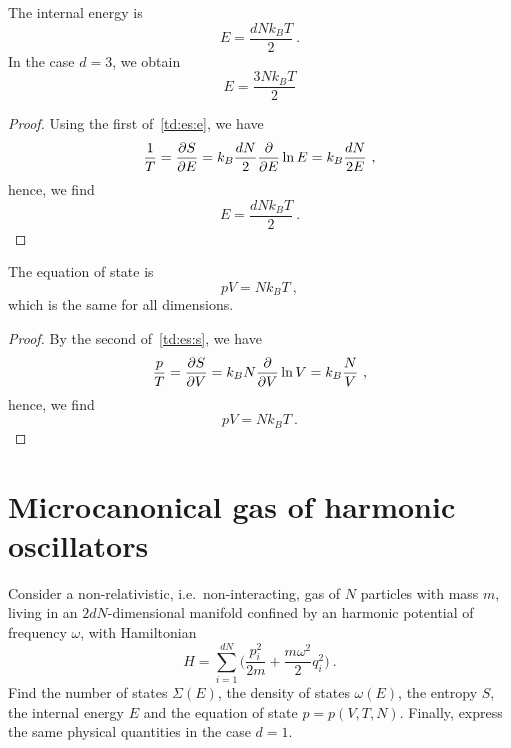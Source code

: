     The internal energy is 
    \begin{equation*}
        E = \frac{d N k_B T}{2} ~.
    \end{equation*}
    In the case $d = 3$, we obtain 
    \begin{equation*}
        E = \frac{3 N k_B T}{2}
    \end{equation*}
    \begin{proof}
        Using the first of~\eqref{td:es:e}, we have
        \begin{equation*}
            \frac{1}{T} = \frac{\partial S}{\partial E} = k_B \frac{dN}{2} \frac{\partial}{\partial E} \ln E = k_B \frac{dN}{2E} ~,
        \end{equation*}
        hence, we find
        \begin{equation*}
            E = \frac{d N k_B T}{2} ~.
        \end{equation*}
    \end{proof}
    The equation of state is  
    \begin{equation*}
        p V = N k_B T ~,
    \end{equation*}
    which is the same for all dimensions.
    \begin{proof}
        By the second of~\eqref{td:es:s}, we have
        \begin{equation*}
            \frac{p}{T} = \frac{\partial S}{\partial V} = k_B N \frac{\partial}{\partial V} \ln V = k_B \frac{N}{V}  ~,
        \end{equation*}
        hence, we find
        \begin{equation*}
            pV = N k_B T ~.
        \end{equation*}
    \end{proof}

\section{Microcanonical gas of harmonic oscillators}

    \begin{exercise}
        Consider a non-relativistic, i.e.~non-interacting, gas of $N$ particles with mass $m$, living in an $2dN$-dimensional manifold confined by an harmonic potential of frequency $\omega$, with Hamiltonian 
        \begin{equation*}
            H = \sum_{i =1}^{dN} \Big ( \frac{p^2_i}{2m} + \frac{m \omega^2}{2} q_i^2 \Big ) ~.
        \end{equation*}
        Find the number of states $\Sigma(E)$, the density of states $\omega(E)$, the entropy $S$, the internal energy $E$ and the equation of state $p = p(V, T, N)$. Finally, express the same physical quantities in the case $d = 1$.
    \end{exercise}

